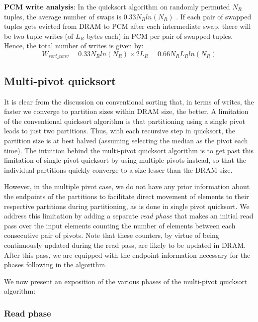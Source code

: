 \textbf{PCM write analysis}: In the quicksort algorithm on randomly permuted $N_R$ tuples, the average number of swaps is $0.33N_Rln(N_R)$ \cite{swaps}. If each pair of swapped tuples gets evicted from DRAM to PCM after each intermediate swap, there will be two tuple writes (of $L_R$ bytes each) in PCM per pair of swapped tuples. Hence, the total number of writes is given by:
\begin{equation}\label{eq:sort_conv}
  W_{sort\_conv} = 0.33N_Rln(N_R) \times 2L_R = 0.66 N_RL_Rln(N_R)
  \end{equation}
  
  
\subsection{Multi-pivot quicksort}
\label{subsec:sort_mpivot}
It is clear from the discussion on conventional sorting that, in terms of writes, the faster we converge to partition sizes within DRAM size, the better. A limitation of the conventional quicksort algorithm is that partitioning using a single pivot leads to just two partitions. Thus, with each recursive step in quicksort, the partition size is at best halved (assuming selecting the median as the pivot each time). The intuition behind the multi-pivot quicksort algorithm is to get past this limitation of single-pivot quicksort by using multiple pivots instead, so that the individual partitions quickly converge to a size lesser than the DRAM size.

However, in the multiple pivot case, we do not have any prior information about the endpoints of the partitions to facilitate direct movement of elements to their respective partitions during partitioning, as is done in single pivot quicksort. We address this limitation by adding a separate \textit{read phase} that makes an initial read pass over the input elements counting the number of elements between each consecutive pair of pivots. Note that these counters, by virtue of being continuously updated during the read pass, are likely to be updated in DRAM. After this pass, we are equipped with the endpoint information necessary for the phases following in the algorithm.

We now present an exposition of the various phases of the multi-pivot quicksort algorithm:

\subsubsection{Read phase} 



